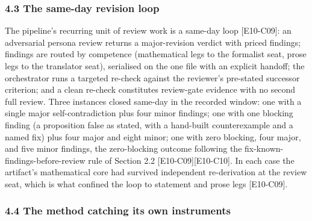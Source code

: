 \documentclass[
  11pt,
]{article}
\begin{document}
\subsubsection{4.3 The same-day revision
loop}\label{the-same-day-revision-loop}

The pipeline's recurring unit of review work is a same-day loop
{[}E10-C09{]}: an adversarial persona review returns a major-revision
verdict with priced findings; findings are routed by competence
(mathematical legs to the formalist seat, prose legs to the translator
seat), serialised on the one file with an explicit handoff; the
orchestrator runs a targeted re-check against the reviewer's pre-stated
successor criterion; and a clean re-check constitutes review-gate
evidence with no second full review. Three instances closed same-day in
the recorded window: one with a single major self-contradiction plus
four minor findings; one with one blocking finding (a proposition false
as stated, with a hand-built counterexample and a named fix) plus four
major and eight minor; one with zero blocking, four major, and five
minor findings, the zero-blocking outcome following the
fix-known-findings-before-review rule of Section 2.2
{[}E10-C09{]}{[}E10-C10{]}. In each case the artifact's mathematical
core had survived independent re-derivation at the review seat, which is
what confined the loop to statement and prose legs {[}E10-C09{]}.

\subsubsection{4.4 The method catching its own
instruments}\label{the-method-catching-its-own-instruments}
\end{document}
